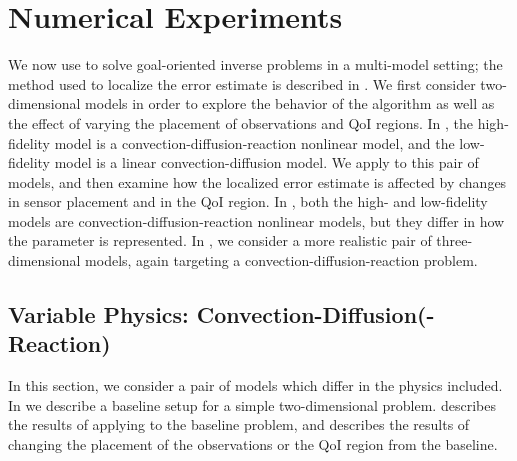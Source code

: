 \section{Numerical Experiments}\label{sec:numexp}
%
We now use  to solve goal-oriented inverse problems in a multi-model setting; the method used to localize the error estimate is described in . We first consider two-dimensional models in order to explore the behavior of the algorithm as well as the effect of varying the placement of observations and QoI regions. In , the high-fidelity model is a convection-diffusion-reaction nonlinear model, and the low-fidelity model is a linear convection-diffusion model. We apply  to this pair of models, and then examine how the localized error estimate is affected by changes in sensor placement and in the QoI region. In , both the high- and low-fidelity models are convection-diffusion-reaction nonlinear models, but they differ in how the parameter is represented. In , we consider a more realistic pair of three-dimensional models, again targeting a convection-diffusion-reaction problem.


\subsection{Variable Physics: Convection-Diffusion(-Reaction)} \label{sec:cdvcdr}
In this section, we consider a pair of models which differ in the physics included. In  we describe a baseline setup for a simple two-dimensional problem.  describes the results of applying  to the baseline problem, and  describes the results of changing the placement of the observations or the QoI region from the baseline.
%
